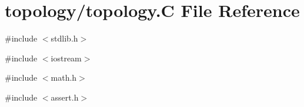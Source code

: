 \hypertarget{topology_8C}{
\section{topology/topology.C File Reference}
\label{topology_8C}
}
{\ttfamily \#include $<$stdlib.h$>$}\par
{\ttfamily \#include $<$iostream$>$}\par
{\ttfamily \#include $<$math.h$>$}\par
{\ttfamily \#include $<$assert.h$>$}\par
